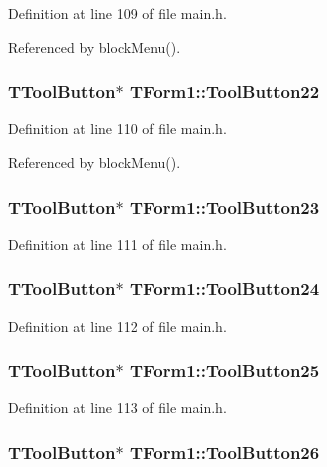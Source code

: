 Definition at line 109 of file main.h.

Referenced by blockMenu().\hypertarget{classTForm1_221d9932d360c903b3c14f26d7b3ae90}{
\subsubsection[ToolButton22]{\setlength{\rightskip}{0pt plus 5cm}TToolButton$\ast$ {\bf TForm1::ToolButton22}}}
\label{classTForm1_221d9932d360c903b3c14f26d7b3ae90}




Definition at line 110 of file main.h.

Referenced by blockMenu().\hypertarget{classTForm1_040e77d5967da02a5aa3c462055f510d}{
\subsubsection[ToolButton23]{\setlength{\rightskip}{0pt plus 5cm}TToolButton$\ast$ {\bf TForm1::ToolButton23}}}
\label{classTForm1_040e77d5967da02a5aa3c462055f510d}




Definition at line 111 of file main.h.\hypertarget{classTForm1_a2f6a2763d31ea472eb438aefc802161}{
\subsubsection[ToolButton24]{\setlength{\rightskip}{0pt plus 5cm}TToolButton$\ast$ {\bf TForm1::ToolButton24}}}
\label{classTForm1_a2f6a2763d31ea472eb438aefc802161}




Definition at line 112 of file main.h.\hypertarget{classTForm1_1346d2adf8108f59475e9b51746d1b5d}{
\subsubsection[ToolButton25]{\setlength{\rightskip}{0pt plus 5cm}TToolButton$\ast$ {\bf TForm1::ToolButton25}}}
\label{classTForm1_1346d2adf8108f59475e9b51746d1b5d}




Definition at line 113 of file main.h.\hypertarget{classTForm1_de1f9eff17d771f91c82706d6aa801ff}{
\subsubsection[ToolButton26]{\setlength{\rightskip}{0pt plus 5cm}TToolButton$\ast$ {\bf TForm1::ToolButton26}}}
\label{classTForm1_de1f9eff17d771f91c82706d6aa801ff}




